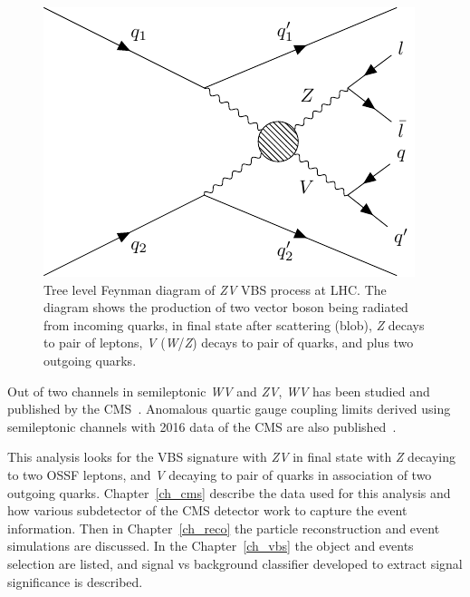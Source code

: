 \begin{figure}[!ht]
  \centering
  \begin{minipage}{0.5\textwidth}
    \includegraphics[width=\textwidth]{figures/feyn_vbs_0.pdf}
    \vspace{5pt}
  \end{minipage}
  \caption[Tree level Feynman diagram of \textit{ZV} VBS process at LHC]%
  {Tree level Feynman diagram of \textit{ZV} VBS process at LHC\@. The diagram
    shows the production of two vector boson being radiated from incoming
    quarks, in final state after scattering (blob), \textit{Z} decays
    to pair of leptons, \textit{V} (\textit{W}/\textit{Z}) decays to pair of quarks,
    and plus two outgoing quarks.
  }%
  \label{fig:feynman-vbs}
\end{figure}

Out of two channels in semileptonic \textit{WV} and \textit{ZV},
\textit{WV} has been studied and published by the \gls{CMS}~\cite{vbs-wv-cms-2021}.
Anomalous quartic gauge coupling limits derived using semileptonic
channels with 2016 data of the \gls{CMS} are also published~\cite{wv-vbs-aqgc}.

This analysis looks for the \gls{VBS} signature with \textit{ZV} in final state
with \textit{Z} decaying to two \gls{OSSF} leptons, and \textit{V} decaying to pair
of quarks in association of two outgoing quarks. Chapter~\ref{ch_cms}
describe the data used for this analysis and how
various subdetector of the \gls{CMS} detector work to capture the
event information. Then in Chapter~\ref{ch_reco} the particle
reconstruction and event simulations are discussed. In the
Chapter~\ref{ch_vbs} the object and events selection
are listed, and signal vs background classifier developed
to extract signal significance is described.
